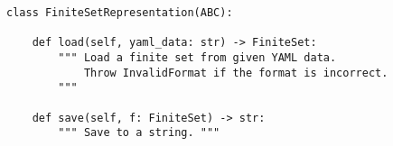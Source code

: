 \begin{verbatim}
class FiniteSetRepresentation(ABC):

    def load(self, yaml_data: str) -> FiniteSet:
        """ Load a finite set from given YAML data.
            Throw InvalidFormat if the format is incorrect.
        """

    def save(self, f: FiniteSet) -> str:
        """ Save to a string. """
\end{verbatim}